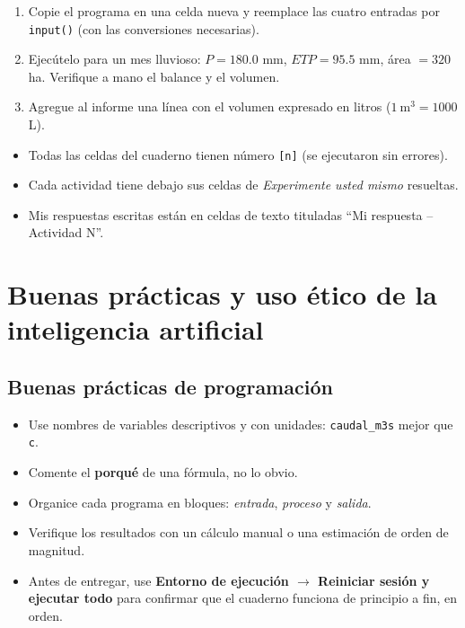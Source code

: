 \documentclass[11pt,a4paper]{article}
\newcommand{\code}[1]{\texttt{#1}}
\newcommand{\menu}[1]{\textbf{\color{moradoOsc}#1}}
\begin{document}
\begin{experimente}
\begin{enumerate}[nosep]
  \item Copie el programa en una celda nueva y reemplace las cuatro entradas por \code{input()} (con las conversiones necesarias).
  \item Ejecútelo para un mes lluvioso: $P = 180.0$ mm, $ETP = 95.5$ mm, área $= 320$ ha. Verifique a mano el balance y el volumen.
  \item Agregue al informe una línea con el volumen expresado en litros ($1\ \text{m}^3 = 1000$ L).
\end{enumerate}
\end{experimente}

\begin{verify}
\begin{itemize}[nosep]
  \item[$\square$] Todas las celdas del cuaderno tienen número \code{[n]} (se ejecutaron sin errores).
  \item[$\square$] Cada actividad tiene debajo sus celdas de \emph{Experimente usted mismo} resueltas.
  \item[$\square$] Mis respuestas escritas están en celdas de texto tituladas ``Mi respuesta -- Actividad N''.
\end{itemize}
\end{verify}

\section{Buenas prácticas y uso ético de la inteligencia artificial}\label{sec:ia}

\subsection{Buenas prácticas de programación}
\begin{itemize}
  \item Use nombres de variables descriptivos y con unidades: \code{caudal\_m3s} mejor que \code{c}.
  \item Comente el \textbf{porqué} de una fórmula, no lo obvio.
  \item Organice cada programa en bloques: \emph{entrada}, \emph{proceso} y \emph{salida}.
  \item Verifique los resultados con un cálculo manual o una estimación de orden de magnitud.
  \item Antes de entregar, use \menu{Entorno de ejecución $\rightarrow$ Reiniciar sesión y ejecutar todo} para confirmar que el cuaderno funciona de principio a fin, en orden.
\end{itemize}
\end{document}
